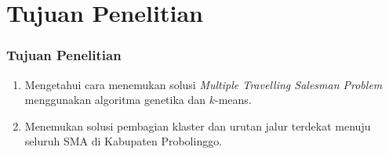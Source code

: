 \section{Tujuan Penelitian}
\begin{frame}
\frametitle{Tujuan Penelitian}
\begin{block}{}
\begin{enumerate}
\item Mengetahui cara menemukan solusi \textit{Multiple Travelling Salesman Problem} menggunakan algoritma genetika dan $k$-means.
\item Menemukan solusi pembagian klaster dan urutan jalur terdekat menuju seluruh SMA di Kabupaten Probolinggo.
\end{enumerate}
\end{block}
\end{frame}